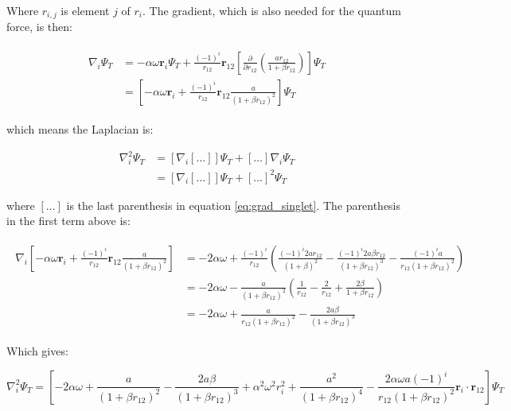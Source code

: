 \documentclass[english, a4paper]{article}
\newcommand{\bm}[1]{\mathbf{#1}}
\begin{document}
Where $r_{i,j}$ is element $j$ of $r_i$.
The gradient, which is also needed for the quantum force, is then:

\begin{align}
	\begin{split}
	\nabla_i\Psi_T &= -\alpha\omega\bm{r}_i\Psi_T + \frac{(-1)^i}{r_{12}}\bm{r}_{12}\left[\frac{\partial}{\partial r_{12}}\left(\frac{ar_{12}}{1+\beta r_{12}}\right)\right]\Psi_T\\
	&= \left[-\alpha\omega\bm{r}_i + \frac{(-1)^i}{r_{12}}\bm{r}_{12}\frac{a}{(1+\beta r_{12})^2}\right]\Psi_T
	\end{split}
	\label{eq:grad_singlet}
\end{align} 

which means the Laplacian is:

\begin{equation}
	\begin{split}
	\nabla_i^2\Psi_T &= \left[\nabla_i[\ldots]\right]\Psi_T + [\ldots]\nabla_i\Psi_T\\
	&= \left[\nabla_i[\ldots]\right]\Psi_T + [\ldots]^2\Psi_T
	\end{split}
\end{equation}

where $[\ldots]$ is the last parenthesis in equation \ref{eq:grad_singlet}. The parenthesis in the first term above is:

\begin{align}
	\begin{split}
	\nabla_i\left[-\alpha\omega\bm{r}_i + \frac{(-1)^i}{r_{12}}\bm{r}_{12}\frac{a}{(1+\beta r_{12})^2}\right] &= -2\alpha\omega + \frac{(-1)^i}{r_{12}}\left( \frac{(-1)^i2ar_{12}}{(1+\beta)^2} - \frac{(-1)^i2a\beta r_{12}}{(1+\beta r_{12})^3} - \frac{(-1)^ia}{r_{12}(1+\beta r_{12})^2}\right)\\
	&= -2\alpha\omega - \frac{a}{(1+\beta r_{12})^2}\left( \frac{1}{r_{12}} - \frac{2}{r_{12}} + \frac{2\beta}{1+\beta r_{12}}\right)\\
	&= -2\alpha\omega + \frac{a}{r_{12}(1+\beta r_{12})^2}- \frac{2a\beta}{(1+\beta r_{12})^3}
	\end{split}
\end{align}

Which gives:

\begin{equation}
	\nabla_i^2\Psi_T = \left[-2\alpha\omega + \frac{a}{(1+\beta r_{12})^2} - \frac{2a\beta}{(1+\beta r_{12})^3} + \alpha^2\omega^2r_i^2 + \frac{a^2}{(1+\beta r_{12})^4} - \frac{2\alpha\omega a(-1)^i}{r_{12}(1+\beta r_{12})^2}\bm{r}_i\cdot\bm{r}_{12}\right] \Psi_T
\end{equation}
\end{document}

